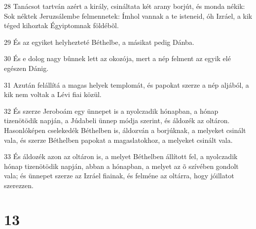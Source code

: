 \par 28 Tanácsot tartván azért a király, csináltata két arany borjút, és monda nékik: Sok néktek Jeruzsálembe felmennetek: Ímhol vannak a te isteneid, óh Izráel, a kik téged kihoztak Égyiptomnak földébõl.
\par 29 És az egyiket helyhezteté Béthelbe, a másikat pedig Dánba.
\par 30 És e dolog nagy bûnnek lett az okozója, mert a nép felment az egyik elé egészen Dánig.
\par 31 Azután felállítá a magas helyek templomát, és papokat szerze a nép aljából, a kik nem voltak a Lévi fiai közül.
\par 32 És szerze Jeroboám egy ünnepet is a nyolczadik hónapban, a hónap tizenötödik napján, a Júdabeli ünnep módja szerint, és áldozék az oltáron. Hasonlóképen cselekedék Béthelben is, áldozván a borjúknak, a melyeket csinált vala, és szerze Béthelben papokat a magaslatokhoz, a melyeket csinált vala.
\par 33 És áldozék azon az oltáron is, a melyet Béthelben állított fel, a nyolczadik hónap tizenötödik napján, abban a hónapban, a melyet az õ szívében gondolt vala; és ünnepet szerze az Izráel fiainak, és felméne az oltárra, hogy jóillatot szerezzen.

\chapter{13}


